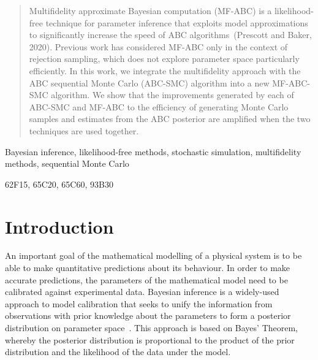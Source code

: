 \documentclass[review]{siamonline190516}
\begin{document}
\maketitle{}

\begin{abstract}
Multifidelity approximate Bayesian computation (MF-ABC) is a likelihood-free technique for parameter inference that exploits model approximations to significantly increase the speed of ABC algorithms~(Prescott and Baker, 2020).
Previous work has considered MF-ABC only in the context of rejection sampling, which does not explore parameter space particularly efficiently.
In this work, we integrate the multifidelity approach with the ABC sequential Monte Carlo (ABC-SMC) algorithm into a new MF-ABC-SMC algorithm.
We show that the improvements generated by each of ABC-SMC and MF-ABC to the efficiency of generating Monte Carlo samples and estimates from the ABC posterior are amplified when the two techniques are used together.
\end{abstract}

\begin{keywords}
Bayesian inference, likelihood-free methods, stochastic simulation, multifidelity methods, sequential Monte Carlo
\end{keywords}

\begin{AMS}
62F15, 65C20, 65C60, 93B30
\end{AMS}

\section{Introduction}
\label{s:Intro}

An important goal of the mathematical modelling of a physical system is to be able to make quantitative predictions about its behaviour.
In order to make accurate predictions, the parameters of the mathematical model need to be calibrated against experimental data.
Bayesian inference is a widely-used approach to model calibration that seeks to unify the information from observations with prior knowledge about the parameters to form a posterior distribution on parameter space~\cite{Beaumont2010,Hines2015,Schnoerr2017}.
This approach is based on Bayes' Theorem, whereby the posterior distribution is proportional to the product of the prior distribution and the likelihood of the data under the model.
\end{document}

